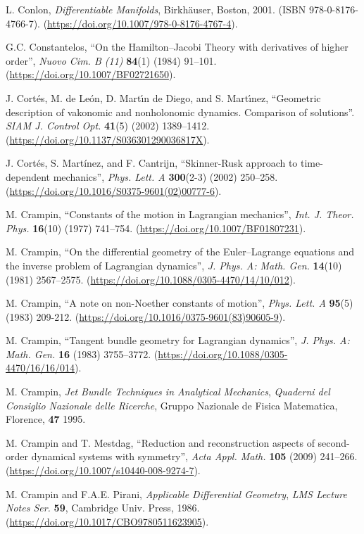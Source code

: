 \documentclass[12pt]{report}
\begin{document}
\begin{thebibliography}{999}
L. Conlon,
{\it Differentiable Manifolds},
Birkh\"auser, Boston, 2001.
(ISBN 978-0-8176-4766-7).
(\url{https://doi.org/10.1007/978-0-8176-4767-4}).

G.C. Constantelos,
``On the Hamilton--Jacobi Theory with derivatives of higher order'',
\textsl{Nuovo Cim. B (11)} \textbf{84}(1) (1984) 91--101.
(\url{https://doi.org/10.1007/BF02721650}).

{\rm J. Cort\'es, M. de Le\'on, D. Mart\'\i n de Diego, and S.
Mart\'\i nez}, 
``Geometric description of vakonomic and
nonholonomic dynamics. Comparison of solutions''. 
{\sl SIAM J. Control Opt.} {\bf 41}(5) (2002) 1389--1412.
(\url{https://doi.org/10.1137/S036301290036817X}).

J. Cort\'es, S. Mart\'inez, and F. Cantrijn,
``Skinner-Rusk approach to time-dependent mechanics'',
{\sl  Phys. Lett. A} {\bf 300}(2-3) (2002) 250--258. 
(\url{https://doi.org/10.1016/S0375-9601(02)00777-6}).

M. Crampin, 
``Constants of the motion in Lagrangian mechanics'',
{\sl  Int. J. Theor. Phys.} {\bf 16}(10) (1977) 741–754.
(\url{https://doi.org/10.1007/BF01807231}).

M. Crampin, 
``On the differential geometry of the Euler--Lagrange equations and the inverse problem of Lagrangian dynamics'',
{\sl  J. Phys. A: Math. Gen.} {\bf 14}(10) (1981) 2567--2575.
(\url{https://doi.org/10.1088/0305-4470/14/10/012}).

M. Crampin, 
``A note on non-Noether constants of motion'', 
{\sl Phys. Lett. A} {\bf 95}(5) (1983) 209-212.
(\url{https://doi.org/10.1016/0375-9601(83)90605-9}).

M. Crampin,
 ``Tangent bundle geometry for Lagrangian dynamics'',
{\sl J. Phys. A: Math. Gen.} {\bf 16} (1983) 3755--3772.
(\url{https://doi.org/10.1088/0305-4470/16/16/014}).

M. Crampin,
{\it Jet Bundle Techniques in Analytical Mechanics},
{\sl Quaderni del Consiglio Nazionale delle Ricerche},
Gruppo Nazionale de Fisica Matematica, Florence,
{\bf 47} 1995.

M. Crampin and T. Mestdag,
``Reduction and reconstruction aspects of second-order dynamical systems with symmetry'',
{\sl Acta Appl. Math.} {\bf 105} (2009) 241--266. (\url{https://doi.org/10.1007/s10440-008-9274-7}).

M. Crampin and F.A.E. Pirani,
{\it Applicable Differential Geometry},
{\sl LMS Lecture Notes Ser.} {\bf 59},
Cambridge Univ. Press, 1986.
(\url{https://doi.org/10.1017/CBO9780511623905}).


\end{thebibliography}
\end{document}
